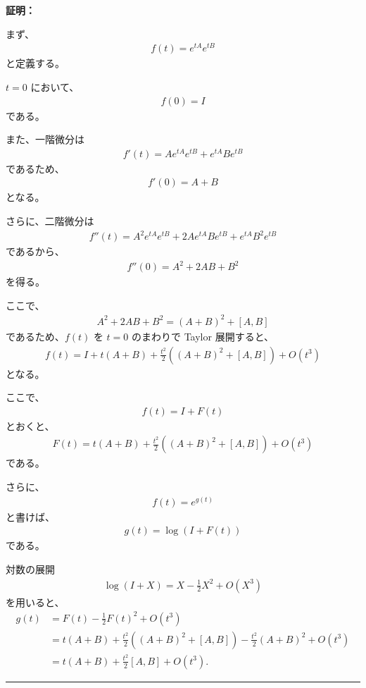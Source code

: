 \documentclass[a4paper,10.5pt]{article}
\numberwithin{equation}{section}
\newenvironment{proofbox}
{\begin{prooflabel}\textbf{証明：}\end{prooflabel}\vspace{0.8em}}
{\par\vspace{1em}\hrule\vspace{1em}}
\begin{document}
\begin{proofbox}
まず、
\begin{align}
    f(t)=e^{tA}e^{tB}
\end{align}
と定義する。

$t=0$ において、
\begin{align}
    f(0)=I
\end{align}
である。

また、一階微分は
\begin{align}
    f'(t)
    =
    Ae^{tA}e^{tB}
    +
    e^{tA}Be^{tB}
\end{align}
であるため、
\begin{align}
    f'(0)=A+B
\end{align}
となる。

さらに、二階微分は
\begin{align}
    f''(t)
    =
    A^2e^{tA}e^{tB}
    +
    2Ae^{tA}Be^{tB}
    +
    e^{tA}B^2e^{tB}
\end{align}
であるから、
\begin{align}
    f''(0)
    =
    A^2+2AB+B^2
\end{align}
を得る。

ここで、
\begin{align}
    A^2+2AB+B^2
    =
    (A+B)^2+[A,B]
\end{align}
であるため、$f(t)$ を $t=0$ のまわりで Taylor 展開すると、
\begin{align}
    f(t)
    =
    I
    +
    t(A+B)
    +
    \frac{t^2}{2}
    \left(
        (A+B)^2+[A,B]
    \right)
    +
    O(t^3)
\end{align}
となる。

ここで、
\begin{align}
    f(t)=I+F(t)
\end{align}
とおくと、
\begin{align}
    F(t)
    =
    t(A+B)
    +
    \frac{t^2}{2}
    \left(
        (A+B)^2+[A,B]
    \right)
    +
    O(t^3)
\end{align}
である。

さらに、
\begin{align}
    f(t)=e^{g(t)}
\end{align}
と書けば、
\begin{align}
    g(t)=\log\left(I+F(t)\right)
\end{align}
である。

対数の展開
\begin{align}
    \log(I+X)
    =
    X-\frac{1}{2}X^2+O(X^3)
\end{align}
を用いると、
\begin{align}
    g(t)
    &=
    F(t)-\frac{1}{2}F(t)^2+O(t^3)
    \\
    &=
    t(A+B)
    +
    \frac{t^2}{2}
    \left(
        (A+B)^2+[A,B]
    \right)
    -
    \frac{t^2}{2}(A+B)^2
    +
    O(t^3)
    \\
    &=
    t(A+B)
    +
    \frac{t^2}{2}[A,B]
    +
    O(t^3).
\end{align}


\end{proofbox}
\end{document}
